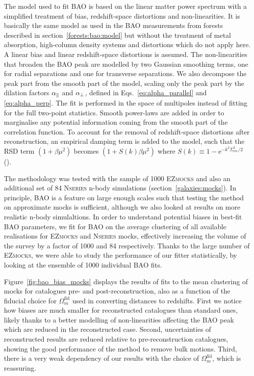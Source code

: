 The model used to fit BAO is based on the linear matter power spectrum with a simplified
treatment of bias, redshift-space distortions and non-linearities. 
It is basically the same model as used in the BAO measurements from 
\lya forests described in section~\ref{forests:bao:model} but without 
the treatment of metal absorption, high-column density systems and 
distortions which do not apply here. 
A linear bias and linear redshift-space distortions is assumed. 
The non-linearities that broaden the BAO peak are modelled by two 
Gaussian smoothing terms, one for radial separations and one for transverse separations. 
We also decompose the peak part from the smooth part of the model, 
scaling only the peak part by the dilation factors ${\alpha_\parallel}$ and ${\alpha_\perp}$, 
defined in Eqs.~\ref{eq:alpha_parallel} and \ref{eq:alpha_perp}.
The fit is performed in the space of multipoles instead of fitting for the 
full two-point statistics. Smooth power-laws are added in order to marginalise 
any potential information coming from the smooth part of the correlation function. 
To account for the removal of redshift-space distortions after reconstruction, 
an empirical damping term is added to the model, such that the RSD term 
$(1+\beta \mu^2)$ becomes $(1+ S(k) \beta \mu^2)$ where 
$S(k)\equiv 1- \text{e}^{-k^2\Sigma^2_\text{rec}/2}$ 
(\cite{seoModelingReconstructedBAO2016}). 

The methodology was tested with the sample of 1000 \textsc{EZmocks} 
and also an additional set of 84 \textsc{Nseries} n-body simulations 
(section~\ref{galaxies:mocks}). 
In principle, BAO is a feature on large enough scales 
such that testing the method on approximate mocks is sufficient, 
although we also looked at results on more realistic n-body simulaltions. 
In order to understand potential biases in best-fit BAO parameters, 
we fit for BAO on the average clustering of all available realisations 
for \textsc{EZmocks} and \textsc{Nseries} mocks,
effectively increasing the volume of the survey by a factor of 1000 and 84
respectively. Thanks to the large number of \textsc{EZmocks}, we 
were able to study the performance of our fitter statistically, 
by looking at the ensemble of 1000 individual BAO fits. 

Figure~\ref{fig:bao_bias_mocks} displays the results of fits 
to the mean clustering of mocks for 
catalogues pre- and post-reconstruction, also as a function of the 
fiducial choice for $\Omega_m^\text{fid}$ used in converting distances to redshifts. 
First we notice how biases are much smaller for reconstructed catalogues 
than standard ones, likely thanks to a better modelling of non-linearities 
affecting the BAO peak which are reduced in the reconstructed case. 
Second, uncertainties of reconstructed results 
are reduced relative to pre-reconstruction catalogues, 
showing the good performance of the method to remove 
bulk motions. 
Third, there is a very weak dependency of our results with the choice of
$\Omega_m^\text{fid}$, which is reassuring. 

